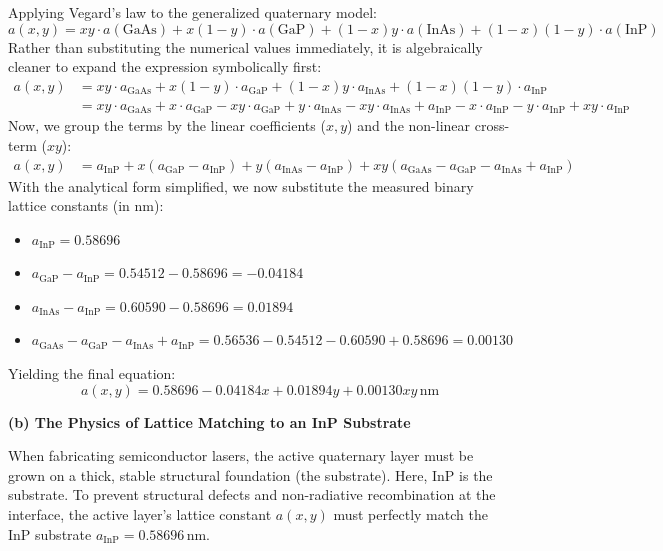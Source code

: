 Applying Vegard's law to the generalized quaternary model:
\begin{equation*}
  a(x,y) = x y \cdot a(\text{GaAs}) + x(1-y) \cdot a(\text{GaP}) + (1-x)y \cdot a(\text{InAs}) + (1-x)(1-y) \cdot a(\text{InP})
\end{equation*}
Rather than substituting the numerical values immediately, it is algebraically cleaner to expand the expression symbolically first:
\begin{align*}
  a(x,y) &= xy \cdot a_{\text{GaAs}} + x(1-y) \cdot a_{\text{GaP}} + (1-x)y \cdot a_{\text{InAs}} + (1-x)(1-y) \cdot a_{\text{InP}} \\
  &= xy \cdot a_{\text{GaAs}} + x \cdot a_{\text{GaP}} - xy \cdot a_{\text{GaP}} + y \cdot a_{\text{InAs}} - xy \cdot a_{\text{InAs}} + a_{\text{InP}} - x \cdot a_{\text{InP}} - y \cdot a_{\text{InP}} + xy \cdot a_{\text{InP}}
\end{align*}
Now, we group the terms by the linear coefficients ($x, y$) and the non-linear cross-term ($xy$):
\begin{align*}
  a(x,y) &= a_{\text{InP}} + x(a_{\text{GaP}} - a_{\text{InP}}) + y(a_{\text{InAs}} - a_{\text{InP}}) + xy(a_{\text{GaAs}} - a_{\text{GaP}} - a_{\text{InAs}} + a_{\text{InP}})
\end{align*}
With the analytical form simplified, we now substitute the measured binary lattice constants (in nm):
\begin{itemize}
    \item $a_{\text{InP}} = 0.58696$
    \item $a_{\text{GaP}} - a_{\text{InP}} = 0.54512 - 0.58696 = -0.04184$
    \item $a_{\text{InAs}} - a_{\text{InP}} = 0.60590 - 0.58696 = 0.01894$
    \item $a_{\text{GaAs}} - a_{\text{GaP}} - a_{\text{InAs}} + a_{\text{InP}} = 0.56536 - 0.54512 - 0.60590 + 0.58696 = 0.00130$
\end{itemize}
Yielding the final equation:
\begin{equation*}
  a(x,y) = 0.58696 - 0.04184 x + 0.01894 y + 0.00130 x y\,\text{nm}
\end{equation*}

\textbf{(b) The Physics of Lattice Matching to an InP Substrate}

When fabricating semiconductor lasers, the active quaternary layer must be grown on a thick, stable structural foundation (the substrate). Here, InP is the substrate. To prevent structural defects and non-radiative recombination at the interface, the active layer's lattice constant $a(x,y)$ must perfectly match the InP substrate $a_{\text{InP}} = 0.58696\,\text{nm}$. 


